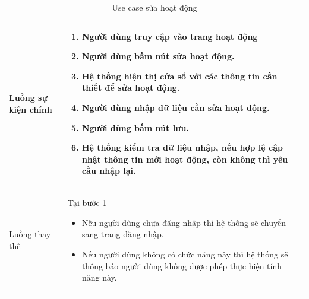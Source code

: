 \documentclass[12pt,a4paper]{article}
\begin{document}
\begin{table}[H]
\begin{tabular}{|p{3.5cm}|p{11.5cm}|c|}
            Luồng sự kiện chính & \vspace{-.8cm}\begin{enumerate}
                                                    \item Người dùng truy cập vào trang hoạt động
                                                    \item  Người dùng bấm nút sửa hoạt động.
                                                    \item  Hệ thống hiện thị cửa sổ với các thông tin cần thiết để sửa hoạt động.
                                                    \item  Người dùng nhập dữ liệu cần sửa hoạt động.
                                                    \item Người dùng bấm nút lưu.
                                                    \item Hệ thống kiểm tra dữ liệu nhập, nếu hợp lệ cập nhật thông tin mới hoạt động, còn không thì yêu cầu nhập lại.
            \end{enumerate}
            \\
            \hline
            Luồng thay thế & Tại bước 1\newline
            \vspace{-.8cm}\begin{itemize}
                              \item Nếu người dùng chưa đăng nhập thì hệ thống sẽ chuyển sang trang đăng nhập.
                              \item  Nếu người dùng không có chức năng này thì hệ thống sẽ thông báo người dùng không được phép thực hiện tính năng này.
            \end{itemize}
            \\
            \hline
        \end{tabular}
        \caption{Use case sửa hoạt động }
    \end{table}


\end{document}
